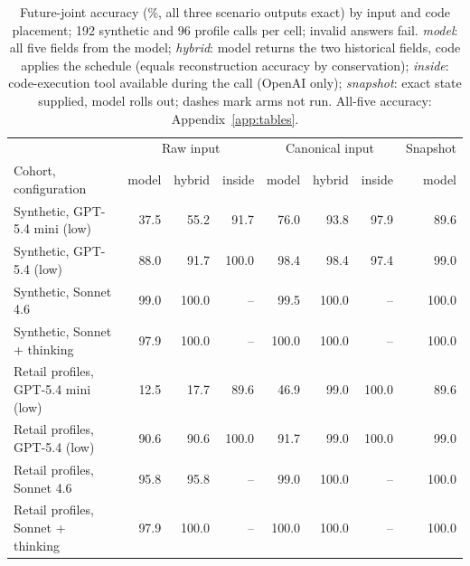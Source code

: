 \begin{table}[t]
\centering\footnotesize
\setlength{\tabcolsep}{4pt}
\begin{tabular}{lrrrrrrr}
\toprule
 & \multicolumn{3}{c}{Raw input} & \multicolumn{3}{c}{Canonical input} & Snapshot \\
Cohort, configuration & model & hybrid & inside & model & hybrid & inside & model \\
\midrule
Synthetic, GPT-5.4 mini (low) & 37.5 & 55.2 & 91.7 & 76.0 & 93.8 & 97.9 & 89.6 \\
Synthetic, GPT-5.4 (low) & 88.0 & 91.7 & 100.0 & 98.4 & 98.4 & 97.4 & 99.0 \\
Synthetic, Sonnet 4.6 & 99.0 & 100.0 & -- & 99.5 & 100.0 & -- & 100.0 \\
Synthetic, Sonnet + thinking & 97.9 & 100.0 & -- & 100.0 & 100.0 & -- & 100.0 \\
\midrule
Retail profiles, GPT-5.4 mini (low) & 12.5 & 17.7 & 89.6 & 46.9 & 99.0 & 100.0 & 89.6 \\
Retail profiles, GPT-5.4 (low) & 90.6 & 90.6 & 100.0 & 91.7 & 99.0 & 100.0 & 99.0 \\
Retail profiles, Sonnet 4.6 & 95.8 & 95.8 & -- & 99.0 & 100.0 & -- & 100.0 \\
Retail profiles, Sonnet + thinking & 97.9 & 100.0 & -- & 100.0 & 100.0 & -- & 100.0 \\
\bottomrule
\end{tabular}
\caption{Future-joint accuracy (\%, all three scenario outputs exact) by input and code placement; 192 synthetic and 96 profile calls per cell; invalid answers fail. \emph{model}: all five fields from the model; \emph{hybrid}: model returns the two historical fields, code applies the schedule (equals reconstruction accuracy by conservation); \emph{inside}: code-execution tool available during the call (OpenAI only); \emph{snapshot}: exact state supplied, model rolls out; dashes mark arms not run. All-five accuracy: Appendix~\ref{app:tables}.}
\label{tab:state}
\end{table}
